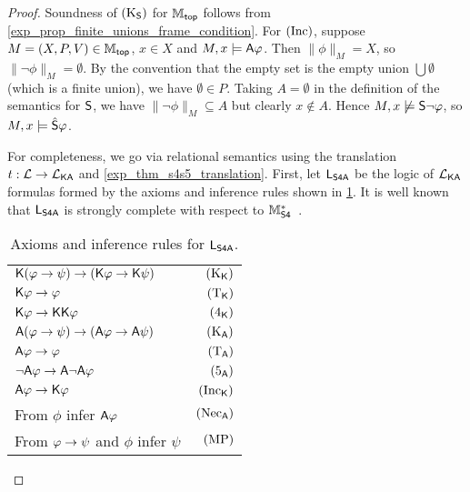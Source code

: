 \begin{proof}
    Soundness of $\Ksoundness$ for $\Mtop$ follows from
    \cref{exp_prop_finite_unions_frame_condition}. For $\inc$, suppose $M = (X, P,
    V) \in \Mtop$, $x \in X$ and $M, x \models \A\phi$. Then $\|\phi\|_M = X$,
    so $\|\neg\phi\|_M = \emptyset$. By the convention that the empty set is
    the empty union $\bigcup\emptyset$ (which is a finite union), we have
    $\emptyset \in P$. Taking $A = \emptyset$ in the definition of the
    semantics for $\S$, we have $\|\neg\phi\|_M \subseteq A$ but clearly $x
    \notin A$. Hence $M, x \not\models \S\neg\phi$, so $M, x \models
    \hat\S\phi$.


For completeness, we go via relational
semantics using the translation $t: \cL \to \cLKA$ and
\cref{exp_thm_s4s5_translation}. First, let $\sLsfoura$ be the logic of $\cLKA$
formulas formed by the axioms and inference rules shown in
\cref{exp_tab_axioms_sfoura}. It is well known that $\sLsfoura$ is strongly
complete with respect to $\Msfour$~\cite[Theorem 7.2]{blackburn2002modal}.

\begin{table}[h]
    \centering
    \caption{Axioms and inference rules for $\sLsfoura$.}
    \label{exp_tab_axioms_sfoura}
    \begin{tabular}{lr}
        \toprule
       $\K(\phi \limplies \psi) \limplies (\K\phi \limplies \K\psi)$
           & $\Kk$ \\
       $\K\phi \limplies \phi$
           & $\Tk$ \\
       $\K\phi \limplies \K\K\phi$
           & $\fourk$ \\
       \midrule
       $\A(\phi \limplies \psi) \limplies (\A\phi \limplies \A\psi)$
           & $\Kuniv$ \\
       $\A\phi \limplies \phi$
           & $\Tuniv$ \\
       $\neg\A\phi \limplies \A\neg\A\phi$
           & $\fiveuniv$ \\
       \midrule
       $\A\phi \limplies \K\phi$
           & $\inck$ \\
       \midrule
       From $\phi$ infer $\A\phi$
           & $\necuniv$ \\
       From $\phi \limplies \psi$ and $\phi$ infer $\psi$
           & $\modpon$ \\
        \bottomrule
    \end{tabular}
\end{table}


\end{proof}
